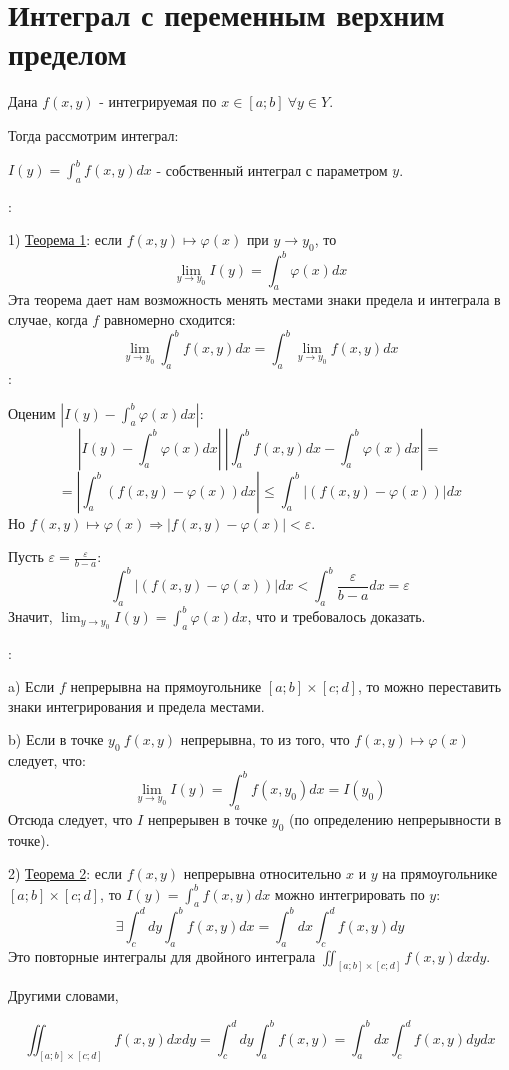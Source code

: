 \documentclass[12pt]{article}
\begin{document}
\section{Интеграл с переменным верхним пределом}
Дана $f(x,y)$ - интегрируемая по $x \in [a;b] \ \forall y \in Y$.\par
Тогда рассмотрим интеграл:\par
$I(y) = \int_a^b f(x,y) dx$ - собственный интеграл с параметром $y$.\par
{}:\par
1) \uline{Теорема 1}: если $f(x,y) \mapsto \varphi(x)$ при $y \to y_0$, то
$$\lim_{y \to y_0} I(y) = \int_a^b \varphi (x) dx$$
Эта теорема дает нам возможность менять местами знаки предела и интеграла в случае, когда $f$ равномерно сходится:
$$\lim_{y \to y_0} \int_a^b f(x,y) dx = \int_a^b \lim_{y \to y_0} f(x,y) dx$$
:\par
Оценим $|I(y)-\int_a^b \varphi(x)dx|$:
$$|I(y)-\int_a^b \varphi(x)dx| \ |\int_a^b f(x,y)dx-\int_a^b \varphi(x)dx| =$$
$$= |\int_a^b (f(x,y)-\varphi(x))dx| \leq \int_a^b |(f(x,y)-\varphi(x))|dx$$
Но $f(x,y) \mapsto \varphi(x) \Rightarrow |f(x,y) - \varphi(x)| < \varepsilon$.\par
Пусть $\varepsilon = \frac{\varepsilon}{b-a}$:
$$\int_a^b |(f(x,y)-\varphi(x))|dx < \int_a^b \frac{\varepsilon}{b-a} dx = \varepsilon$$
Значит, $\lim_{y \to y_0} I(y) = \int_a^b \varphi (x) dx$, что и требовалось доказать.\par
{}:\par
a) Если $f$ непрерывна на прямоугольнике $[a;b] \times [c;d]$, то можно переставить знаки интегрирования и предела местами.\par
b) Если в точке $y_0 \  f(x,y)$ непрерывна, то из того, что $f(x,y) \mapsto \varphi(x)$ следует, что:
$$\lim_{y \to y_0} I(y) = \int_a^b f(x,y_0) dx = I(y_0)$$
Отсюда следует, что $I$ непрерывен в точке $y_0$ (по определению непрерывности в точке).\par
2) \uline{Теорема 2}: если $f(x,y)$ непрерывна относительно $x$ и $y$ на прямоугольнике $[a;b] \times [c;d]$, то $I(y) = \int_a^b f(x,y) dx$ можно интегрировать по $y$:
$$\exists \int_c^d dy \int_a^b f(x,y) dx = \int_a^b dx \int_c^d f(x,y) dy$$
Это повторные интегралы для двойного интеграла $\iint_{[a;b]\times [c;d]} f(x,y) dxdy$.\par
Другими словами,\par $$\iint_{[a;b]\times [c;d]} f(x,y) dxdy = \int_c^d dy \int_a^b f(x,y) = \int_a^b dx \int_c^d f(x,y) dydx$$
\end{document}
